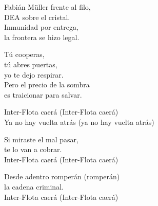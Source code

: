 \begin{lyrics}
Fabián Müller frente al filo,\\
DEA sobre el cristal.\\
Inmunidad por entrega,\\
la frontera se hizo legal.

Tú cooperas,\\
tú abres puertas,\\
yo te dejo respirar.\\
Pero el precio de la sombra\\
es traicionar para salvar.

Inter-Flota caerá
(Inter-Flota caerá)\\
Ya no hay vuelta atrás
(ya no hay vuelta atrás)

Si miraste el mal pasar,\\
te lo van a cobrar.\\
Inter-Flota caerá
(Inter-Flota caerá)

Desde adentro romperán
(romperán)\\
la cadena criminal.\\
Inter-Flota caerá
(Inter-Flota caerá)
\end{lyrics}

